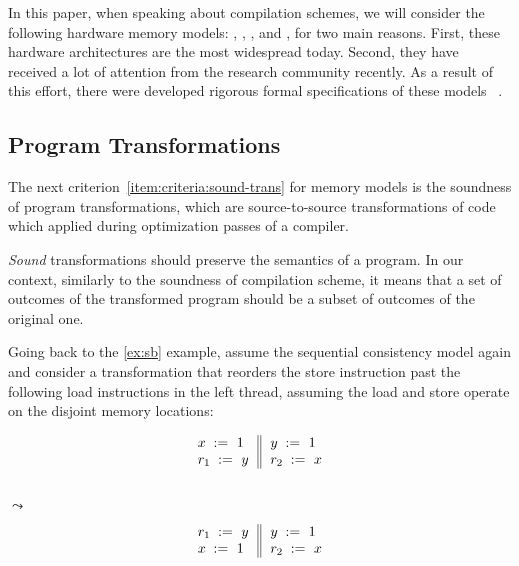 In this paper, when speaking about compilation schemes, 
we will consider the following hardware memory models: 
\Intel, , , and \POWER, 
for two main reasons. 
First, these hardware architectures are the 
most widespread today.
Second, they have received a lot of attention 
from the research community recently. 
As a result of this effort, 
there were developed rigorous formal 
specifications of these models~%
\cite{Sewell-al:CACM10, Sarkar-al:PLDI11, 
Flur-al:POPL16, Pulte-al:POPL18}. 

\subsection{Program Transformations}
\label{sec:background:trans}

The next criterion~\ref{item:criteria:sound-trans} 
for memory models is the soundness of program transformations, 
which are source-to-source transformations of code which applied during 
optimization passes of a compiler. 

\emph{Sound} transformations should preserve the semantics 
of a program. In our context, similarly to the 
soundness of compilation scheme, it means that 
a set of outcomes of the transformed program 
should be a subset of outcomes of the original one. 

Going back to the \ref{ex:sb} example, 
assume the sequential consistency model again and
consider a transformation that reorders 
the store instruction past the following load 
instructions in the left thread, 
assuming the load and store operate on 
the disjoint memory locations:

\begin{minipage}{0.45\linewidth}
\begin{equation*}
\inarrII{
   \writeInst{}{x}{1}   \\
   \readInst{}{r_1}{y}  \\
}{
  \writeInst{}{y}{1}   \\
  \readInst{}{r_2}{x}  \\
}
\end{equation*}
\end{minipage}\hfill%
\begin{minipage}{0.05\linewidth}
\Large~\\ $\leadsto$
\end{minipage}\hfill%
\begin{minipage}{0.45\linewidth}
\begin{equation*}
\inarrII{
   \readInst{}{r_1}{y}  \\
   \writeInst{}{x}{1}   \\
}{
  \writeInst{}{y}{1}   \\
  \readInst{}{r_2}{x}  \\
}
\end{equation*}
\end{minipage}

